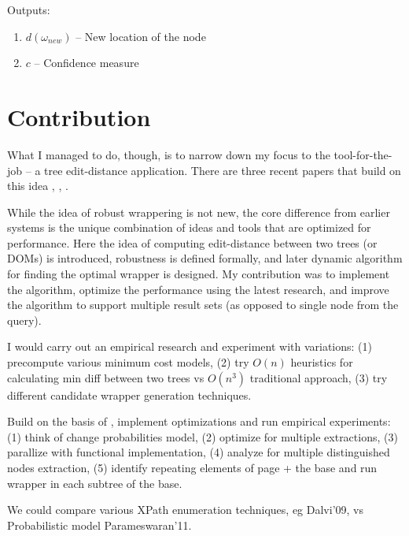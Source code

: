 Outputs: 

\begin{enumerate}
	\item $d(\omega_{new})$ -- New location of the node 
	\item $c$ -- Confidence measure 
\end{enumerate}


\section{Contribution}


What I managed to do, though, is to narrow down my focus to the tool-for-the-job – a tree edit-distance application. There are three recent papers that build on this idea \cite{DBLP:conf/sigmod/DalviBS09}, \cite{DBLP:journals/pvldb/ParameswaranDGR11}, \cite{DBLP:conf/wism/LiuWYL12}.

While the idea of robust wrappering is not new, the core difference from earlier systems is the unique combination of ideas and tools that are optimized for performance.
Here the idea of computing edit-distance between two trees (or DOMs) is introduced, robustness is defined formally, and later dynamic algorithm for finding the optimal wrapper is designed. My contribution was to implement the algorithm, optimize the performance using the latest research, and improve the algorithm to support multiple result sets (as opposed to single node from the query).

I would carry out an empirical research and experiment with variations: (1) precompute various minimum cost models, (2) try $O(n)$ heuristics for calculating min diff between two trees vs $O(n^3)$ traditional approach, (3) try different candidate wrapper generation techniques.

Build on the basis of \cite{DBLP:journals/pvldb/ParameswaranDGR11}, implement optimizations and run empirical experiments: (1) think of change probabilities model, (2) optimize for multiple extractions, (3) parallize with functional implementation, (4) analyze for multiple distinguished nodes extraction, (5) identify repeating elements of page + the base and run wrapper in each subtree of the base.

We could compare various XPath enumeration techniques, eg Dalvi'09, vs Probabilistic model Parameswaran'11.

